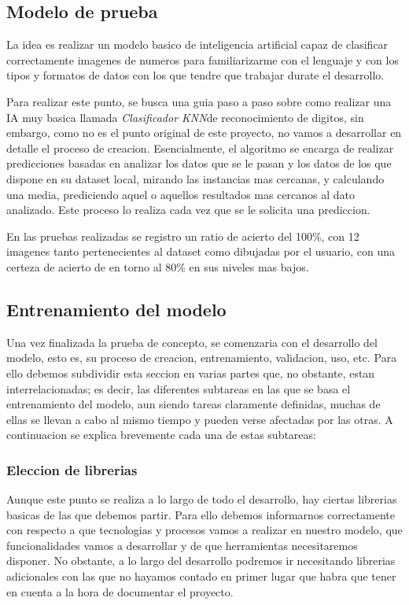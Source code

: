 \documentclass{article}
\begin{document}
\subsection{Modelo de prueba}
La idea es realizar un modelo basico de inteligencia artificial capaz de clasificar correctamente imagenes de numeros para familiarizarme con el lenguaje y con los tipos y formatos de datos con los que tendre que trabajar durate el desarrollo. 
    
Para realizar este punto, se busca una guia paso a paso sobre como realizar una IA muy basica llamada \textit{Clasificador KNN}\rep de reconocimiento de digitos, sin embargo, como no es el punto original de este proyecto, no vamos a desarrollar en detalle el proceso de creacion.
Esencialmente, el algoritmo se encarga de realizar predicciones basadas en analizar los datos que se le pasan y los datos de los que dispone en su dataset local, mirando las instancias mas cercanas, y calculando una media, prediciendo aquel o aquellos resultados mas cercanos al dato analizado. Este proceso lo realiza cada vez que se le solicita una prediccion.
    
En las pruebas realizadas se registro un ratio de acierto del 100\%, con 12 imagenes tanto pertenecientes al dataset como dibujadas por el usuario, con una certeza de acierto de en torno al 80\% en sus niveles mas bajos.


\subsection{Entrenamiento del modelo}
Una vez finalizada la prueba de concepto, se comenzaria con el desarrollo del modelo, esto es, su proceso de creacion, entrenamiento, validacion, uso, etc. Para ello debemos subdividir esta seccion en varias partes que, no obstante, estan interrelacionadas; es decir, las diferentes subtareas en las que se basa el entrenamiento del modelo, aun siendo tareas claramente definidas, muchas de ellas se llevan a cabo al mismo tiempo y pueden verse afectadas por las otras. A continuacion se explica brevemente cada una de estas subtareas:

\subsubsection{Eleccion de librerias}
Aunque este punto se realiza a lo largo de todo el desarrollo, hay ciertas librerias basicas de las que debemos partir. Para ello debemos informarnos correctamente con respecto a que tecnologias y procesos vamos a realizar en nuestro modelo, que funcionalidades vamos a desarrollar y de que herramientas necesitaremos disponer. No obstante, a lo largo del desarrollo podremos ir necesitando librerias adicionales con las que no hayamos contado en primer lugar que habra que tener en cuenta a la hora de documentar el proyecto.
\end{document}
